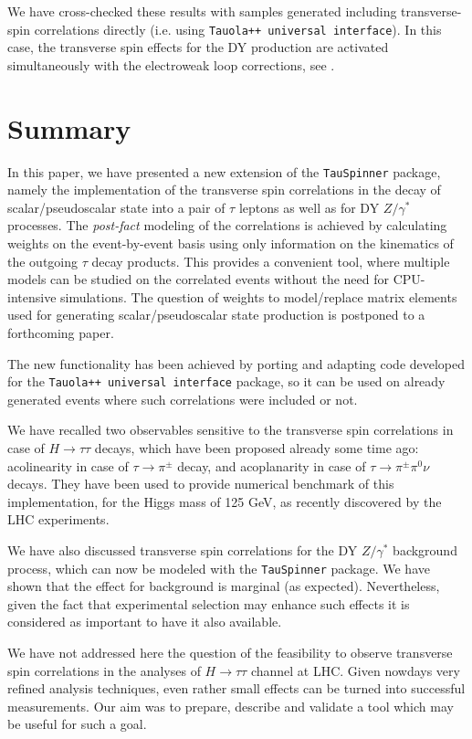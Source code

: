 \documentclass[12pt]{article}
\begin{document}
We have cross-checked these results with samples generated including transverse-spin correlations directly (i.e.
using {\tt Tauola++ universal interface}). In this case, the transverse spin effects for the DY  production are activated 
simultaneously with the electroweak loop corrections, see \cite{Davidson:2010rw}. 

\section { Summary}
\label{sec:summary}

In this paper, we have presented a new extension of the {\tt TauSpinner} package, 
namely the implementation of the transverse spin correlations in the decay of 
scalar/pseudoscalar state into a pair of $\tau$ leptons as well 
as for DY  $Z/\gamma^*$ processes.
The {\it post-fact} modeling of the correlations is achieved by calculating 
weights on the event-by-event basis using only information on the kinematics
of the outgoing $\tau$ decay products. This provides a  convenient tool,
where multiple models can be studied on the correlated events without the need 
for CPU-intensive simulations. The question of weights to model/replace 
matrix elements used for generating scalar/pseudoscalar state production is postponed to a forthcoming 
paper.
 
The new functionality has been achieved by porting and adapting code 
developed for the {\tt Tauola++ universal interface} package, so it can be used 
on already generated events where such correlations were included or not.

We have recalled two observables sensitive to the transverse spin correlations 
in case of $H \to \tau \tau$ decays, which have been proposed already 
some time ago: acolinearity  in case of $\tau \to \pi^\pm$ decay, 
and acoplanarity  in case of $\tau \to \pi^\pm \pi^0 \nu$ decays. 
They have been used to provide numerical benchmark
of this implementation, for the Higgs mass of 125 GeV, as recently 
discovered by the LHC experiments.

We have also discussed transverse spin correlations for the DY  $Z/\gamma^*$ background process,
which can now be modeled 
with the  {\tt TauSpinner} package.
We  have shown 
that the effect for  background is marginal (as expected). Nevertheless, given the fact that
experimental selection may enhance such effects it is considered as important
to have it also available.

We have not addressed here the question of the feasibility to  observe transverse 
spin correlations in the analyses of $H \to \tau \tau$ channel at LHC. 
Given nowdays very refined analysis techniques, even rather small effects
can be turned into successful measurements. Our aim was to prepare, 
describe and validate a tool which may be useful for such a goal.  
 
\end{document}
